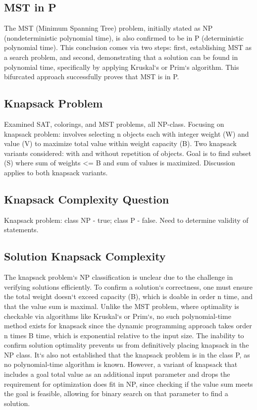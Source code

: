 \subsection*{MST in P}
The MST (Minimum Spanning Tree) problem, initially stated as NP (nondeterministic polynomial time), is also confirmed to be in P (deterministic polynomial time).
This conclusion comes via two steps: first, establishing MST as a search problem, and second, demonstrating that a solution can be found in polynomial time, specifically by applying Kruskal`s or Prim`s algorithm.
This bifurcated approach successfully proves that MST is in P\@.

\subsection*{Knapsack Problem}
Examined SAT, colorings, and MST problems, all NP-class.
Focusing on knapsack problem: involves selecting n objects each with integer weight (W) and value (V) to maximize total value within weight capacity (B).
Two knapsack variants considered: with and without repetition of objects.
Goal is to find subset (S) where sum of weights \textless{}= B and sum of values is maximized.
Discussion applies to both knapsack variants.

\subsection*{Knapsack Complexity Question}
Knapsack problem: class NP - true; class P - false.
Need to determine validity of statements.

\subsection*{Solution  Knapsack Complexity}
The knapsack problem`s NP classification is unclear due to the challenge in verifying solutions efficiently.
To confirm a solution`s correctness, one must ensure the total weight doesn`t exceed capacity (B), which is doable in order n time, and that the value sum is maximal.
Unlike the MST problem, where optimality is checkable via algorithms like Kruskal`s or Prim`s, no such polynomial-time method exists for knapsack since the dynamic programming approach takes order n times B time, which is exponential relative to the input size.
The inability to confirm solution optimality prevents us from definitively placing knapsack in the NP class.
It`s also not established that the knapsack problem is in the class P, as no polynomial-time algorithm is known.
However, a variant of knapsack that includes a goal total value as an additional input parameter and drops the requirement for optimization does fit in NP, since checking if the value sum meets the goal is feasible, allowing for binary search on that parameter to find a solution.

